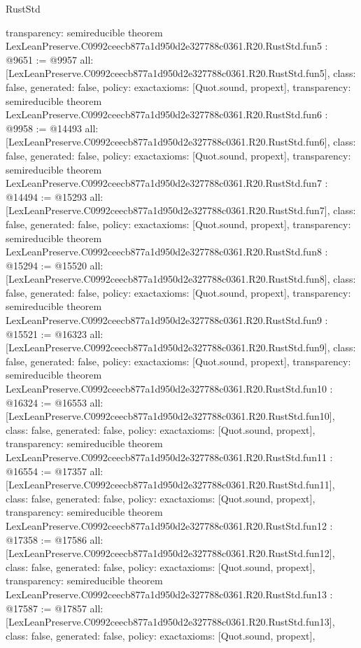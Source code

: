 \begin{lexlean}{RustStd}
\begin{coremodule}
{  transparency: semireducible
}
theorem LexLeanPreserve.C0992ceecb877a1d950d2e327788c0361.R20.RustStd.fun5 : @9651 := @9957 {
  all: [LexLeanPreserve.C0992ceecb877a1d950d2e327788c0361.R20.RustStd.fun5],
  class: false,
  generated: false,
  policy: exact{axioms: [Quot.sound, propext]},
  transparency: semireducible
}
theorem LexLeanPreserve.C0992ceecb877a1d950d2e327788c0361.R20.RustStd.fun6 : @9958 := @14493 {
  all: [LexLeanPreserve.C0992ceecb877a1d950d2e327788c0361.R20.RustStd.fun6],
  class: false,
  generated: false,
  policy: exact{axioms: [Quot.sound, propext]},
  transparency: semireducible
}
theorem LexLeanPreserve.C0992ceecb877a1d950d2e327788c0361.R20.RustStd.fun7 : @14494 := @15293 {
  all: [LexLeanPreserve.C0992ceecb877a1d950d2e327788c0361.R20.RustStd.fun7],
  class: false,
  generated: false,
  policy: exact{axioms: [Quot.sound, propext]},
  transparency: semireducible
}
theorem LexLeanPreserve.C0992ceecb877a1d950d2e327788c0361.R20.RustStd.fun8 : @15294 := @15520 {
  all: [LexLeanPreserve.C0992ceecb877a1d950d2e327788c0361.R20.RustStd.fun8],
  class: false,
  generated: false,
  policy: exact{axioms: [Quot.sound, propext]},
  transparency: semireducible
}
theorem LexLeanPreserve.C0992ceecb877a1d950d2e327788c0361.R20.RustStd.fun9 : @15521 := @16323 {
  all: [LexLeanPreserve.C0992ceecb877a1d950d2e327788c0361.R20.RustStd.fun9],
  class: false,
  generated: false,
  policy: exact{axioms: [Quot.sound, propext]},
  transparency: semireducible
}
theorem LexLeanPreserve.C0992ceecb877a1d950d2e327788c0361.R20.RustStd.fun10 : @16324 := @16553 {
  all: [LexLeanPreserve.C0992ceecb877a1d950d2e327788c0361.R20.RustStd.fun10],
  class: false,
  generated: false,
  policy: exact{axioms: [Quot.sound, propext]},
  transparency: semireducible
}
theorem LexLeanPreserve.C0992ceecb877a1d950d2e327788c0361.R20.RustStd.fun11 : @16554 := @17357 {
  all: [LexLeanPreserve.C0992ceecb877a1d950d2e327788c0361.R20.RustStd.fun11],
  class: false,
  generated: false,
  policy: exact{axioms: [Quot.sound, propext]},
  transparency: semireducible
}
theorem LexLeanPreserve.C0992ceecb877a1d950d2e327788c0361.R20.RustStd.fun12 : @17358 := @17586 {
  all: [LexLeanPreserve.C0992ceecb877a1d950d2e327788c0361.R20.RustStd.fun12],
  class: false,
  generated: false,
  policy: exact{axioms: [Quot.sound, propext]},
  transparency: semireducible
}
theorem LexLeanPreserve.C0992ceecb877a1d950d2e327788c0361.R20.RustStd.fun13 : @17587 := @17857 {
  all: [LexLeanPreserve.C0992ceecb877a1d950d2e327788c0361.R20.RustStd.fun13],
  class: false,
  generated: false,
  policy: exact{axioms: [Quot.sound, propext]},
}
\end{coremodule}
\end{lexlean}
